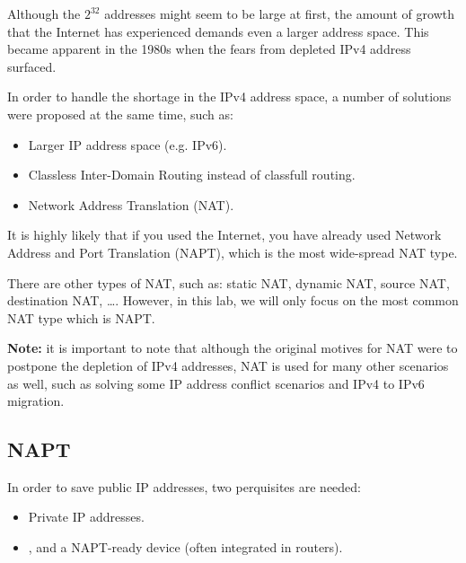 \documentclass[pdftex,12pt,a4paper]{article}
\begin{document}
        Although the $2^{32}$ addresses might seem to be large at first, the
        amount of  growth that the Internet has experienced demands even a
        larger address space. This became apparent in the 1980s when the fears
        from depleted IPv4 address surfaced.

        In order to handle the shortage in the IPv4 address space, a number of
        solutions were proposed at the same time, such as:
        \begin{itemize}
            \item Larger IP address space (e.g. IPv6).
            \item Classless Inter-Domain Routing instead of classfull routing.
            \item Network Address Translation (NAT).
        \end{itemize}

        It is highly likely that if you used the Internet, you have already
        used Network Address and Port Translation (NAPT), which is the most
        wide-spread NAT type.

        There are other types of NAT, such as: static NAT, dynamic NAT, source NAT,
        destination NAT, \ldots. However, in this lab, we will only focus on the most
        common NAT type which is NAPT.

        \textbf{Note:} it is important to note that although the original
        motives for NAT were to postpone the depletion of IPv4 addresses,
        NAT is used for many other scenarios as well, such as solving some IP
        address conflict scenarios and IPv4 to IPv6 migration.

        \subsection{NAPT}
            In order to save public IP addresses, two perquisites are needed:
            \begin{itemize}
                \item Private IP addresses.
                \item , and a NAPT-ready device (often integrated in routers).
            \end{itemize}
\end{document}
